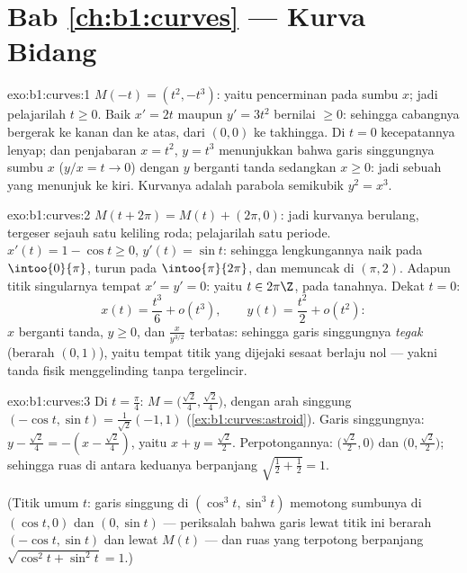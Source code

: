 \section*{Bab \ref{ch:b1:curves} --- Kurva Bidang}

\begin{solution}{exo:b1:curves:1}
$M(-t) = (t^2, -t^3)$: yaitu pencerminan pada sumbu $x$; jadi pelajarilah $t \geq 0$.
Baik $x' = 2t$ maupun $y' = 3t^2$ bernilai $\geq 0$: sehingga cabangnya bergerak
ke kanan dan ke atas, dari $(0,0)$ ke takhingga. Di $t = 0$ kecepatannya
lenyap; dan penjabaran $x = t^2$, $y = t^3$ menunjukkan bahwa garis singgungnya
sumbu $x$ ($y/x = t \to 0$) dengan $y$ berganti tanda sedangkan $x \geq 0$:
jadi sebuah \emph{} yang menunjuk ke kiri. Kurvanya adalah parabola semikubik
$y^2 = x^3$.
\end{solution}

\begin{solution}{exo:b1:curves:2}
$M(t + 2\pi) = M(t) + (2\pi, 0)$: jadi kurvanya berulang, tergeser sejauh
satu keliling roda; pelajarilah satu periode. $x'(t) = 1 - \cos t \geq
0$, $y'(t) = \sin t$: sehingga lengkungannya naik pada $\intoo{0}{\pi}$, turun pada
$\intoo{\pi}{2\pi}$, dan memuncak di $(\pi, 2)$. Adapun titik singularnya
tempat $x' = y' = 0$: yaitu $t \in 2\pi\Z$, pada tanahnya. Dekat $t = 0$:
\[
x(t) = \frac{t^3}{6} + o(t^3),
\qquad
y(t) = \frac{t^2}{2} + o(t^2):
\]
$x$ berganti tanda, $y \geq 0$, dan $\frac{x}{y^{3/2}}$ terbatas: sehingga
garis singgungnya \emph{tegak} (berarah $(0,1)$), yaitu  tempat
titik yang dijejaki sesaat berlaju nol --- yakni tanda fisik
menggelinding tanpa tergelincir.
\end{solution}

\begin{solution}{exo:b1:curves:3}
Di $t = \frac\pi4$: $M = \bigl(\frac{\sqrt2}{4},
\frac{\sqrt2}{4}\bigr)$, dengan arah singgung $(-\cos t, \sin t) =
\frac{1}{\sqrt2}(-1, 1)$ (\cref{ex:b1:curves:astroid}). Garis
singgungnya: $y - \frac{\sqrt2}{4} = -(x - \frac{\sqrt2}{4})$, yaitu $x +
y = \frac{\sqrt2}{2}$. Perpotongannya: $\bigl(\frac{\sqrt2}{2},
0\bigr)$ dan $\bigl(0, \frac{\sqrt2}{2}\bigr)$; sehingga ruas di antara
keduanya berpanjang $\sqrt{\frac12 + \frac12} = 1$.

(Titik umum $t$: garis singgung di $(\cos^3 t, \sin^3 t)$ memotong
sumbunya di $(\cos t, 0)$ dan $(0, \sin t)$ --- periksalah bahwa garis
lewat titik ini berarah $(-\cos t, \sin t)$ dan lewat
$M(t)$ --- dan ruas yang terpotong berpanjang $\sqrt{\cos^2 t +
\sin^2 t} = 1$.)
\end{solution}

